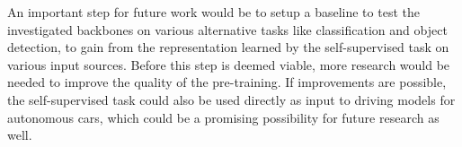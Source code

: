 An important step for future work would be to setup a baseline to test the investigated backbones on various alternative tasks like classification and object detection, to gain from the representation learned by the self-supervised task on various input sources. Before this step is deemed viable, more research would be needed to improve the quality of the pre-training. If improvements are possible, the self-supervised task could also be used directly as input to driving models for autonomous cars, which could be a promising possibility for future research as well. 


